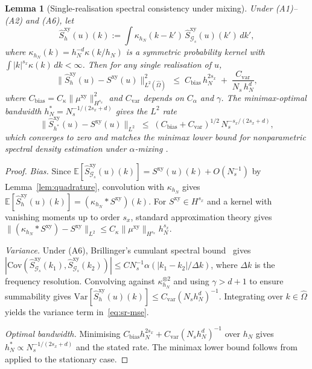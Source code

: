 \documentclass[review,12pt]{elsarticle}
\newtheorem{lemma}{Lemma}
\begin{document}
\begin{lemma}[Single-realisation spectral consistency under mixing]
\label{lem:single-realisation}
Under (A1)--(A2) and (A6), let
\[
\widehat S^{\mathrm{xy}}_h(u)(k)
:= \int \kappa_{h_N}(k - k')\,
\widehat S^{\mathrm{xy}}_{\mathcal G_s}(u)(k')\,dk',
\]
where \(\kappa_{h_N}(k) = h_N^{-d}\kappa(k/h_N)\) is a symmetric
probability kernel with
\(\int |k|^{s_x}\kappa(k)\,dk < \infty\).
Then for any single realisation of \(u\),
\begin{equation}
\label{eq:sr-mse}
\bigl\|\widehat S^{\mathrm{xy}}_h(u) - S^{\mathrm{xy}}(u)
\bigr\|^2_{L^2(\widehat\Omega)}
\;\le\;
C_{\mathrm{bias}}\,h_N^{2s_x}
\;+\;
\frac{C_{\mathrm{var}}}{N_s\,h_N^{d}},
\end{equation}
where \(C_{\mathrm{bias}} = C_\kappa\|\mu^{\mathrm{xy}}\|^2_{H^{s_x}}\)
and \(C_{\mathrm{var}}\) depends on \(C_\alpha\) and \(\gamma\).
The minimax-optimal bandwidth \(h_N^* = N_s^{-1/(2s_x + d)}\)
gives the \(L^2\) rate
\[
\bigl\|\widehat S^{\mathrm{xy}}_{h^*}(u) - S^{\mathrm{xy}}(u)
\bigr\|_{L^2}
\;\le\;(C_{\mathrm{bias}}+C_{\mathrm{var}})^{1/2}\,
N_s^{-s_x/(2s_x+d)},
\]
which converges to zero and matches the minimax lower bound for
nonparametric spectral density estimation under \(\alpha\)-mixing
\cite{Dahlhaus1996}.
\end{lemma}
\begin{proof}
\emph{Bias.} Since
\(\mathbb E[\widehat S^{\mathrm{xy}}_{\mathcal G_s}(u)(k)] =
S^{\mathrm{xy}}(u)(k) + O(N_s^{-1})\) by
Lemma~\ref{lem:quadrature}, convolution with \(\kappa_{h_N}\)
gives
\(\mathbb E[\widehat S^{\mathrm{xy}}_h(u)(k)] =
(\kappa_{h_N} * S^{\mathrm{xy}})(k)\).
For \(S^{\mathrm{xy}} \in H^{s_x}\) and a kernel with vanishing
moments up to order \(s_x\), standard approximation theory gives
\(\|(\kappa_{h_N} * S^{\mathrm{xy}}) - S^{\mathrm{xy}}\|_{L^2}
\le C_\kappa \|\mu^{\mathrm{xy}}\|_{H^{s_x}} h_N^{s_x}\).

\emph{Variance.} Under (A6), Brillinger's cumulant spectral
bound~\cite[Thm.~4.3.2]{Brillinger1981} gives
\(|\mathrm{Cov}(\widehat S^{\mathrm{xy}}_{\mathcal G_s}(k_1),
\widehat S^{\mathrm{xy}}_{\mathcal G_s}(k_2))|
\le C N_s^{-1} \alpha(|k_1 - k_2|/\Delta k)\),
where \(\Delta k\) is the frequency resolution.
Convolving against \(\kappa_{h_N}^{\otimes 2}\) and using
\(\gamma > d + 1\) to ensure summability gives
\(\mathrm{Var}[\widehat S^{\mathrm{xy}}_h(u)(k)]
\le C_{\mathrm{var}}(N_s h_N^d)^{-1}\).
Integrating over \(k \in \widehat\Omega\) yields the variance term
in~\eqref{eq:sr-mse}.

\emph{Optimal bandwidth.} Minimising
\(C_{\mathrm{bias}} h_N^{2s_x} + C_{\mathrm{var}}(N_s h_N^d)^{-1}\)
over \(h_N\) gives \(h_N^* \propto N_s^{-1/(2s_x+d)}\) and the
stated rate. The minimax lower bound follows
from~\cite[Thm.~3.1]{Dahlhaus1996} applied to the stationary case.
\end{proof}
\end{document}
